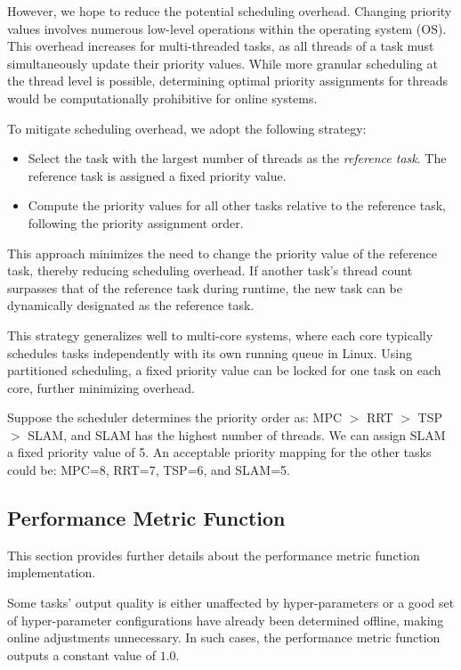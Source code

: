 However, we hope to reduce the potential scheduling overhead.
Changing priority values involves numerous low-level operations within the operating system (OS).
This overhead increases for multi-threaded tasks, as all threads of a task must simultaneously update their priority values.
While more granular scheduling at the thread level is possible, determining optimal priority assignments for threads would be computationally prohibitive for online systems.

To mitigate scheduling overhead, we adopt the following strategy:
\begin{itemize}
    \item Select the task with the largest number of threads as the \textit{reference task}.
    The reference task is assigned a fixed priority value.
    \item Compute the priority values for all other tasks relative to the reference task, following the priority assignment order.
\end{itemize}

This approach minimizes the need to change the priority value of the reference task, thereby reducing scheduling overhead.
If another task's thread count surpasses that of the reference task during runtime, the new task can be dynamically designated as the reference task.

This strategy generalizes well to multi-core systems, where each core typically schedules tasks independently with its own running queue in Linux.
Using partitioned scheduling, a fixed priority value can be locked for one task on each core, further minimizing overhead.

\begin{Example}
Suppose the scheduler determines the priority order as: MPC $>$ RRT $>$ TSP $>$ SLAM, and SLAM has the highest number of threads.
We can assign SLAM a fixed priority value of 5.
An acceptable priority mapping for the other tasks could be: MPC=8, RRT=7, TSP=6, and SLAM=5.
\end{Example}

\subsection{Performance Metric Function}
\label{section_generate_tsp_perf}
This section provides further details about the performance metric function implementation.

Some tasks' output quality is either unaffected by hyper-parameters or a good set of hyper-parameter configurations have already been determined offline, making online adjustments unnecessary.
In such cases, the performance metric function outputs a constant value of $1.0$.


